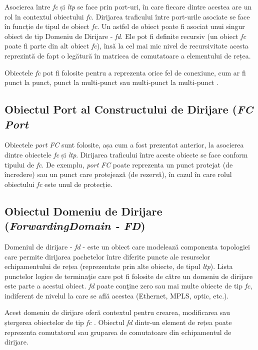 Asocierea între \textit{\gls{fc}} și \textit{\gls{ltp}} se face prin port-uri, în care fiecare dintre acestea are un rol în contextul obiectului \textit{\gls{fc}}. Dirijarea traficului între port-urile asociate se face în funcție de tipul de obiect \textit{\gls{fc}}. Un astfel de obiect poate fi asociat unui singur obiect de tip Domeniu de Dirijare - \textit{\gls{fd}}. Ele pot fi definite recursiv (un obiect \textit{\gls{fc}} poate fi parte din alt obiect \textit{\gls{fc}}), însă la cel mai mic nivel de recursivitate acesta reprezintă de fapt o legătură în matricea de comutatoare a elementului de rețea.

Obiectele \textit{\gls{fc}} pot fi folosite pentru a reprezenta orice fel de conexiune, cum ar fi punct la punct, punct la multi-punct sau multi-punct la multi-punct \cite{onftr512v1.2}.

\subsection{Obiectul Port al Constructului de Dirijare (\textit{FC Port}}

Obiectele \textit{port FC} sunt folosite, așa cum a fost prezentat anterior, la asocierea dintre obiectele \textit{\gls{fc}} și \textit{\gls{ltp}}. Dirijarea traficului între aceste obiecte se face conform tipului de \textit{\gls{fc}}. De exemplu, \textit{port FC} poate reprezenta un punct protejat (de încredere) sau un punct care protejează (de rezervă), în cazul în care rolul obiectului \textit{\gls{fc}} este unul de protecție.

\subsection{Obiectul Domeniu de Dirijare (\textit{ForwardingDomain - FD})}

Domeniul de dirijare - \textit{\gls{fd}} - este un obiect care modelează componenta topologiei care permite dirijarea pachetelor între diferite puncte ale resurselor echipamentului de rețea (reprezentate prin alte obiecte, de tipul \textit{\gls{ltp}}). Lista punctelor logice de terminaţie care pot fi folosite de către un domeniu de dirijare este parte a acestui obiect. \textit{\gls{fd}} poate conţine zero sau mai multe obiecte de tip \textit{\gls{fc}}, indiferent de nivelul la care se află acestea (Ethernet, MPLS, optic, etc.). 

Acest domeniu de dirijare oferă contextul pentru crearea, modificarea sau ștergerea obiectelor de tip \textit{\gls{fc}} \cite{onftr512v1.2}. Obiectul \textit{\gls{fd}} dintr-un element de rețea poate reprezenta comutatorul sau gruparea de comutatoare din echipamentul de dirijare.

